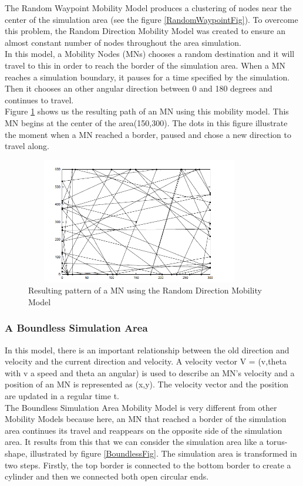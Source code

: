 The Random Waypoint Mobility Model produces a clustering of nodes near the center of the simulation area (see the figure \ref{RandomWaypointFig}). To overcome this problem, the Random Direction Mobility Model was created to ensure an almost constant number of nodes throughout the area simulation.\\ 
In this model, a Mobility Nodes (MNs) chooses a random destination and it will travel to this in order to reach the border of the simulation area. When a MN reaches a simulation boundary, it pauses for a time specified by the simulation. Then it chooses an other angular direction between 0 and 180 degrees and continues to travel.\\ 
Figure \ref{RandomDirectionFig} shows us the resulting path of an MN using this mobility model. This MN begins at the center of the area(150,300). The dots in this figure illustrate the moment when a MN reached a border, paused and chose a new direction to travel along.\\

\begin{figure}[h]
\center
\includegraphics[width=10cm,height=55mm]{../images/randomdirection1.png}
\caption{\label{RandomDirectionFig}Resulting pattern of a MN using the Random Direction Mobility Model\cite{SurveyMobilityModelsAdHoc1}}
\end{figure}

\newpage

\subsubsection{A Boundless Simulation Area}

In this model, there is an important relationship between the old direction and velocity and the current direction and velocity. A velocity vector V = (v,theta with v a speed and theta an angular) is used to describe an MN's velocity and a position of an MN is represented as (x,y). The velocity vector and the position are updated in a regular time t.\\
The Boundless Simulation Area Mobility Model is very different from other Mobility Models because here, an MN that reached a border of the simulation area continues its travel and reappears on the opposite side of the simulation area. It results from this that we can consider the simulation area like a torus-shape, illustrated by figure \ref{BoundlessFig}. The simulation area is transformed in two steps. Firstly, the top border is connected to the bottom border to create a cylinder and then we connected both open circular ends.\\

